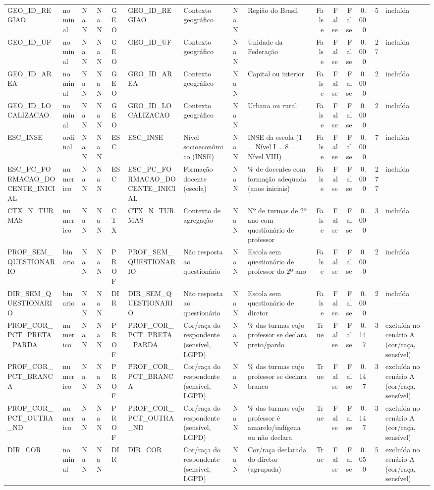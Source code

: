 \begin{tabular}{lllllllllrrrrrl}
GEO\_ID\_REGIAO & nominal & NaN & NaN & GEO & GEO\_ID\_REGIAO & Contexto geográfico & NaN & Região do Brasil & False & False & False & 0.000 & 5 & incluída \\
GEO\_ID\_UF & nominal & NaN & NaN & GEO & GEO\_ID\_UF & Contexto geográfico & NaN & Unidade da Federação & False & False & False & 0.000 & 27 & incluída \\
GEO\_ID\_AREA & nominal & NaN & NaN & GEO & GEO\_ID\_AREA & Contexto geográfico & NaN & Capital ou interior & False & False & False & 0.000 & 2 & incluída \\
GEO\_ID\_LOCALIZACAO & nominal & NaN & NaN & GEO & GEO\_ID\_LOCALIZACAO & Contexto geográfico & NaN & Urbana ou rural & False & False & False & 0.000 & 2 & incluída \\
ESC\_INSE & ordinal & NaN & NaN & ESC & ESC\_INSE & Nível socioeconômico (INSE) & NaN & INSE da escola (1 = Nível I … 8 = Nível VIII) & False & False & False & 0.000 & 7 & incluída \\
ESC\_PC\_FORMACAO\_DOCENTE\_INICIAL & numerico & NaN & NaN & ESC & ESC\_PC\_FORMACAO\_DOCENTE\_INICIAL & Formação docente (escola) & NaN & \% de docentes com formação adequada (anos iniciais) & False & False & False & 0.000 & 277 & incluída \\
CTX\_N\_TURMAS & numerico & NaN & NaN & CTX & CTX\_N\_TURMAS & Contexto de agregação & NaN & Nº de turmas de 2º ano com questionário de professor & False & False & False & 0.000 & 3 & incluída \\
PROF\_SEM\_QUESTIONARIO & binario & NaN & NaN & PROF & PROF\_SEM\_QUESTIONARIO & Não resposta ao questionário & NaN & Escola sem questionário de professor do 2º ano & False & False & False & 0.000 & 2 & incluída \\
DIR\_SEM\_QUESTIONARIO & binario & NaN & NaN & DIR & DIR\_SEM\_QUESTIONARIO & Não resposta ao questionário & NaN & Escola sem questionário de diretor & False & False & False & 0.000 & 2 & incluída \\
PROF\_COR\_PCT\_PRETA\_PARDA & numerico & NaN & NaN & PROF & PROF\_COR\_PCT\_PRETA\_PARDA & Cor/raça do respondente (sensível, LGPD) & NaN & \% das turmas cujo professor se declara preto/pardo & True & False & False & 0.147 & 3 & excluída no cenário A (cor/raça, sensível) \\
PROF\_COR\_PCT\_BRANCA & numerico & NaN & NaN & PROF & PROF\_COR\_PCT\_BRANCA & Cor/raça do respondente (sensível, LGPD) & NaN & \% das turmas cujo professor se declara branco & True & False & False & 0.147 & 3 & excluída no cenário A (cor/raça, sensível) \\
PROF\_COR\_PCT\_OUTRA\_ND & numerico & NaN & NaN & PROF & PROF\_COR\_PCT\_OUTRA\_ND & Cor/raça do respondente (sensível, LGPD) & NaN & \% das turmas cujo professor é amarelo/indígena ou não declara & True & False & False & 0.147 & 3 & excluída no cenário A (cor/raça, sensível) \\
DIR\_COR & nominal & NaN & NaN & DIR & DIR\_COR & Cor/raça do respondente (sensível, LGPD) & NaN & Cor/raça declarada do diretor (agrupada) & True & False & False & 0.050 & 5 & excluída no cenário A (cor/raça, sensível) \\
\bottomrule
\end{tabular}
